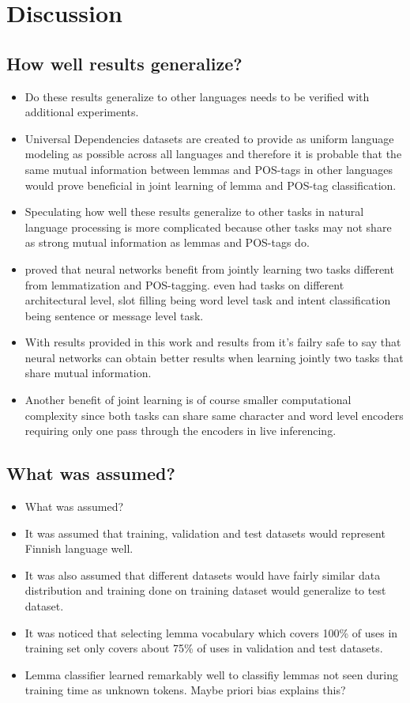 \documentclass[12pt,a4paper,english
]{tutthesis}
\begin{document}
\chapter{Discussion}
\label{ch:discussion}
\section{How well results generalize?}
\begin{itemize}
\item Do these results generalize to other languages needs to be verified with additional experiments.
\item Universal Dependencies datasets are created to provide as uniform language modeling as possible across all languages and therefore it is probable that the same mutual information between lemmas and POS-tags in other languages would prove beneficial in joint learning of lemma and POS-tag classification.
\item Speculating how well these results generalize to other tasks in natural language processing is more complicated because other tasks may not share as strong mutual information as lemmas and POS-tags do.
\item \cite{Liang2016a} proved that neural networks benefit from jointly learning two tasks different from lemmatization and POS-tagging. \cite{Liu2016a} even had tasks on different architectural level, slot filling being word level task and intent classification being sentence or message level task.
\item With results provided in this work and results from \cite{Liu2016a} it's failry safe to say that neural networks can obtain better results when learning jointly two tasks that share mutual information.
\item Another benefit of joint learning is of course smaller computational complexity since both tasks can share same character and word level encoders requiring only one pass through the encoders in live inferencing.
\end{itemize}

\section{What was assumed?}
\begin{itemize}
\item What was assumed?
\item It was assumed that training, validation and test datasets would represent Finnish language well.
\item It was also assumed that different datasets would have fairly similar data distribution and training done on training dataset would generalize to test dataset.
\item It was noticed that selecting lemma vocabulary which covers 100\% of uses in training set only covers about 75\% of uses in validation and test datasets.
\item Lemma classifier learned remarkably well to classifiy lemmas not seen during training time as unknown tokens. Maybe priori bias explains this?
\end{itemize}
\end{document}
